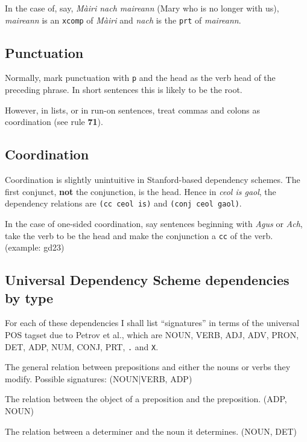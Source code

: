 \documentclass[a4paper]{article}
\begin{document}
 In the case of, say, \textit{M\`airi nach maireann} (Mary who is no longer with us), \textit{maireann} is an \texttt{xcomp} of \textit{M\`airi} and \textit{nach} is the \texttt{prt} of \textit{maireann}.

\subsection{Punctuation}

 Normally, mark punctuation with \texttt{p} and the head as the verb head of the preceding phrase. In short sentences this is likely to be the root.

 However, in lists, or in run-on sentences, treat commas and colons as coordination (see rule \textbf{71}).

\subsection{Coordination}

 Coordination is slightly unintuitive in Stanford-based dependency schemes. The first conjunct, \textbf{not} the conjunction, is the head. Hence in \textit{ceol is gaol}, the dependency relations are \texttt{(cc ceol is)} and \texttt{(conj ceol gaol)}.

 In the case of one-sided coordination, say sentences beginning with \textit{Agus} or \textit{Ach}, take the verb to be the head and make the conjunction a \texttt{cc} of the verb. (example: gd23)

\subsection{Universal Dependency Scheme dependencies by type}

 For each of these dependencies I shall list ``signatures'' in terms of the universal POS tagset due to Petrov et al., which are NOUN, VERB, ADJ, ADV, PRON, DET, ADP, NUM, CONJ, PRT, \texttt{.} and \texttt{X}.

 The general relation between prepositions and either the nouns or verbs they modify. Possible signatures: (NOUN|VERB, ADP)

 The relation between the object of a preposition and the preposition. (ADP, NOUN)

 The relation between a determiner and the noun it determines. (NOUN, DET)
\end{document}
